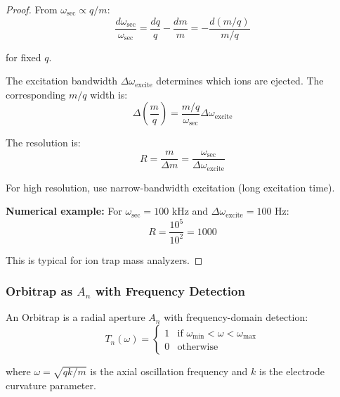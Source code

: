 \begin{proof}
From $\omega_{\text{sec}} \propto q/m$:
\begin{equation}
\frac{d\omega_{\text{sec}}}{\omega_{\text{sec}}} = \frac{dq}{q} - \frac{dm}{m} = -\frac{d(m/q)}{m/q}
\end{equation}

for fixed $q$.

The excitation bandwidth $\Delta\omega_{\text{excite}}$ determines which ions are ejected. The corresponding $m/q$ width is:
\begin{equation}
\Delta\left(\frac{m}{q}\right) = \frac{m/q}{\omega_{\text{sec}}} \Delta\omega_{\text{excite}}
\end{equation}

The resolution is:
\begin{equation}
R = \frac{m}{\Delta m} = \frac{\omega_{\text{sec}}}{\Delta\omega_{\text{excite}}}
\end{equation}

For high resolution, use narrow-bandwidth excitation (long excitation time).

\textbf{Numerical example:} For $\omega_{\text{sec}} = 100$ kHz and $\Delta\omega_{\text{excite}} = 100$ Hz:
\begin{equation}
R = \frac{10^5}{10^2} = 1000
\end{equation}

This is typical for ion trap mass analyzers.
\end{proof}

\subsubsection{Orbitrap as $A_n$ with Frequency Detection}

\begin{theorem}
\label{thm:orbitrap_frequency}
An Orbitrap is a radial aperture $A_n$ with frequency-domain detection:
\begin{equation}
T_n(\omega) = \begin{cases}
1 & \text{if } \omega_{\min} < \omega < \omega_{\max} \\
0 & \text{otherwise}
\end{cases}
\end{equation}

where $\omega = \sqrt{qk/m}$ is the axial oscillation frequency and $k$ is the electrode curvature parameter.
\end{theorem}

